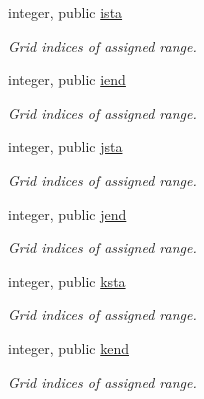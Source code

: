 \textbf{ }\par
\begin{DoxyCompactItemize}
\item 
integer, public \mbox{\hyperlink{namespacemodule__mpi__subdomain_a84290c344044aaadb0957d8530f360b6}{ista}}
\begin{DoxyCompactList}\small\item\em Grid indices of assigned range. \end{DoxyCompactList}\item 
integer, public \mbox{\hyperlink{namespacemodule__mpi__subdomain_ac0d40d9eee1ec5249fb230e7d73959d5}{iend}}
\begin{DoxyCompactList}\small\item\em Grid indices of assigned range. \end{DoxyCompactList}\item 
integer, public \mbox{\hyperlink{namespacemodule__mpi__subdomain_a87c16acea97b6100c4629bda8a090169}{jsta}}
\begin{DoxyCompactList}\small\item\em Grid indices of assigned range. \end{DoxyCompactList}\item 
integer, public \mbox{\hyperlink{namespacemodule__mpi__subdomain_a5c6fcfcea80e9294d32411c15091955c}{jend}}
\begin{DoxyCompactList}\small\item\em Grid indices of assigned range. \end{DoxyCompactList}\item 
integer, public \mbox{\hyperlink{namespacemodule__mpi__subdomain_a3eab4b23cbc7b4ab032da06300bfca6f}{ksta}}
\begin{DoxyCompactList}\small\item\em Grid indices of assigned range. \end{DoxyCompactList}\item 
integer, public \mbox{\hyperlink{namespacemodule__mpi__subdomain_a2d63d8a25db336795c14328ed3b31047}{kend}}
\begin{DoxyCompactList}\small\item\em Grid indices of assigned range. \end{DoxyCompactList}\end{DoxyCompactItemize}

